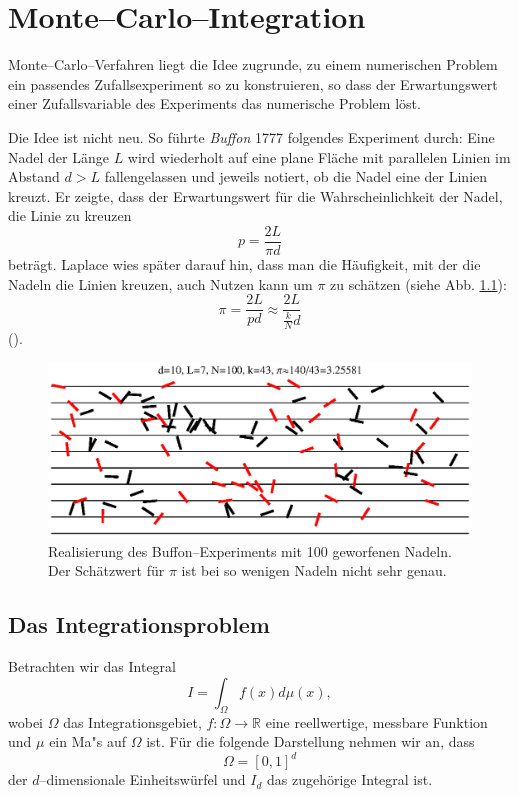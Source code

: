 	\chapter{Monte--Carlo--Integration}\label{chapter:mc_integration}
	Monte--Carlo--Verfahren liegt die Idee zugrunde, zu einem numerischen Problem ein passendes Zufallsexperiment so zu konstruieren, so dass der Erwartungswert einer Zufallsvariable des Experiments das numerische Problem löst.
	
	Die Idee ist nicht neu. So führte {\em Buffon} 1777 folgendes Experiment durch: Eine Nadel der Länge $L$ wird wiederholt auf eine plane Fläche mit parallelen Linien im Abstand $d>L$ fallengelassen und jeweils notiert, ob die Nadel eine der Linien kreuzt. Er zeigte, dass der Erwartungswert für die Wahrscheinlichkeit der Nadel, die Linie zu kreuzen $$p=\frac{2L}{\pi d}$$ beträgt. Laplace wies später darauf hin, dass  man die Häufigkeit, mit der die Nadeln die Linien kreuzen, auch Nutzen kann um $\pi$ zu schätzen (siehe Abb. \ref{fig:buffon}): $$\pi=\frac{2L}{p d}\approx \frac{2L}{\frac{k}{N}d}$$
	().
	\begin{figure}
		\centering
		\includegraphics[height=0.3\textheight]{buffonsneedles.eps}
		\caption{Realisierung des Buffon--Experiments mit 100 geworfenen Nadeln. Der Schätzwert für $\pi$ ist bei so wenigen Nadeln nicht sehr genau.}
		\label{fig:buffon}
	\end{figure}
	
	\section{Das Integrationsproblem}\label{subsec:integrationsproblem}
	Betrachten wir das Integral
	\begin{equation}
		I=\int_\Omega f(x) d\mu(x),
		\label{eq:integration_problem}
	\end{equation}
	wobei $\Omega$ das Integrationsgebiet, $f : \Omega \to \mathbb{R}$ eine reellwertige, messbare Funktion und $\mu$ ein Ma"s auf $\Omega$ ist. Für die folgende Darstellung nehmen wir an, dass $$\Omega=[0,1]^d$$ der $d$--dimensionale Einheitswürfel und $I_d$ das zugehörige Integral ist.

